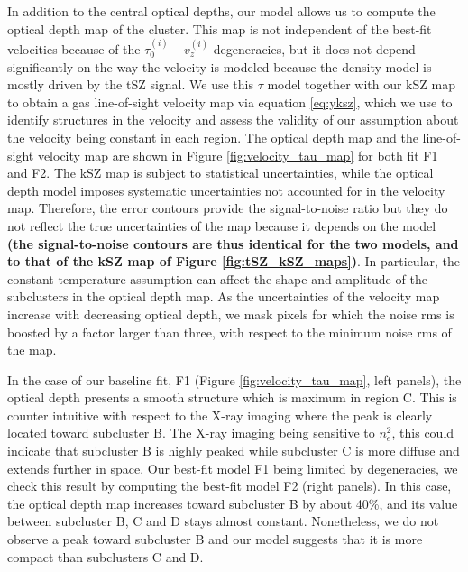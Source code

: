 \documentclass[twocolumn,traditabstract]{aa}
\begin{document}
In addition to the central optical depths, our model allows us to compute the optical depth map of the cluster. This map is not independent of the best-fit velocities because of the $\tau_0^{(i)}$ -- $v_z^{(i)}$ degeneracies, but it does not depend significantly on the way the velocity is modeled because the density model is mostly driven by the tSZ signal. We use this $\tau$ model together with our kSZ map to obtain a gas line-of-sight velocity map via equation \ref{eq:yksz}, which we use to identify structures in the velocity and assess the validity of our assumption about the velocity being constant in each region. The optical depth map and the line-of-sight velocity map are shown in Figure \ref{fig:velocity_tau_map} for both fit F1 and F2. The kSZ map is subject to statistical uncertainties, while the optical depth model imposes systematic uncertainties not accounted for in the velocity map. Therefore, the error contours provide the signal-to-noise ratio but they do not reflect the true uncertainties of the map because it depends on the model {\bf (the signal-to-noise contours are thus identical for the two models, and to that of the kSZ map of Figure \ref{fig:tSZ_kSZ_maps})}. In particular, the constant temperature assumption can affect the shape and amplitude of the subclusters in the optical depth map. As the uncertainties of the velocity map increase with decreasing optical depth, we mask pixels for which the noise rms is boosted by a factor larger than three, with respect to the minimum noise rms of the map.

In the case of our baseline fit, F1 (Figure \ref{fig:velocity_tau_map}, left panels), the optical depth presents a smooth structure which is maximum in region C. This is counter intuitive with respect to the X-ray imaging where the peak is clearly located toward subcluster B. The X-ray imaging being sensitive to $n_e^2$, this could indicate that subcluster B is highly peaked while subcluster C is more diffuse and extends further in space. Our best-fit model F1 being limited by degeneracies, we check this result by computing the best-fit model F2 (right panels). In this case, the optical depth map increases toward subcluster B by about 40\%, and its value between subcluster B, C and D stays almost constant. Nonetheless, we do not observe a peak toward subcluster B and our model suggests that it is more compact than subclusters C and D.
\end{document}
